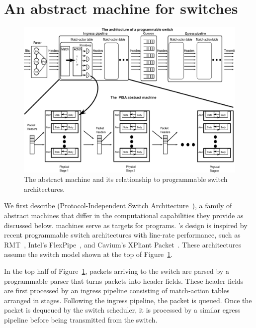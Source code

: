 \section{An abstract machine for switches}
\label{s:absmachine}

\begin{figure}[!t]
  \includegraphics[width=\textwidth]{pisa.pdf}
  \caption{The \absmachine abstract machine and its relationship to
  programmable switch architectures.}
  \label{fig:switch}
\end{figure}

We first describe \absmachine (Protocol-Independent Switch
Architecture~\cite{nick_p4}), a family of abstract machines that differ in the
computational capabilities they provide as discussed below. \absmachine
machines serve as targets for \pktlanguage programs. \absmachine's design is
inspired by recent programmable switch architectures with line-rate
performance, such as RMT~\cite{rmt}, Intel's FlexPipe~\cite{flexpipe}, and
Cavium's XPliant Packet~\cite{xpliant}.  These architectures assume the switch
model shown at the top of Figure~\ref{fig:switch}.

In the top half of Figure~\ref{fig:switch}, packets arriving to the switch are
parsed by a programmable parser that turns packets into header fields. These
header fields are first processed by an ingress pipeline consisting of
match-action tables arranged in stages.  Following the ingress pipeline, the
packet is queued. Once the packet is dequeued by the switch scheduler, it is
processed by a similar egress pipeline before being transmitted from the
switch.

